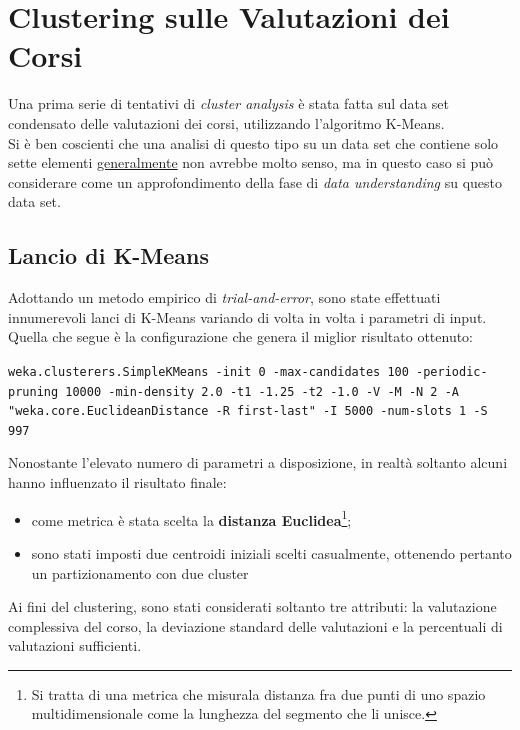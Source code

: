 \section{Clustering sulle Valutazioni dei Corsi}

    Una prima serie di tentativi di \textit{cluster analysis} è stata fatta sul data set condensato delle valutazioni dei corsi, utilizzando l'algoritmo K-Means. \\

    Si è ben coscienti che una analisi di questo tipo su un data set che contiene solo sette elementi \underline{generalmente} non avrebbe molto senso, ma in questo caso si può considerare come un approfondimento della fase di \textit{data understanding} su questo data set.

    \subsection{Lancio di K-Means}

        Adottando un metodo empirico di \textit{trial-and-error}, sono state effettuati innumerevoli lanci di K-Means variando di volta in volta i parametri di input. \\

        Quella che segue è la configurazione che genera il miglior risultato ottenuto:

        \begin{center}
            \texttt{weka.clusterers.SimpleKMeans -init 0 -max-candidates 100 -periodic-pruning 10000 -min-density 2.0 -t1 -1.25 -t2 -1.0 -V -M -N 2 -A "weka.core.EuclideanDistance -R first-last" -I 5000 -num-slots 1 -S 997}
        \end{center}

        Nonostante l'elevato numero di parametri a disposizione, in realtà soltanto alcuni hanno influenzato il risultato finale:

        \begin{itemize}
            \item come metrica è stata scelta la \textbf{distanza Euclidea}\footnote{Si tratta di una metrica che misurala distanza fra due punti di uno spazio multidimensionale come la lunghezza del segmento che li unisce.};
            \item sono stati imposti due centroidi iniziali scelti casualmente, ottenendo pertanto un partizionamento con due cluster
        \end{itemize}

        Ai fini del clustering, sono stati considerati soltanto tre attributi: la valutazione complessiva del corso, la deviazione standard delle valutazioni e la percentuali di valutazioni sufficienti.

